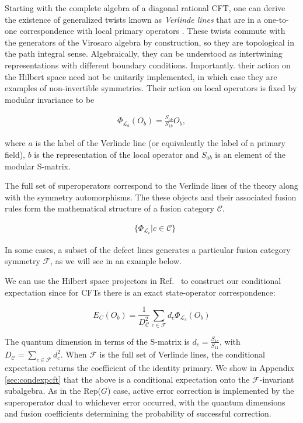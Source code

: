 \documentclass{article}
\newcommand{\mC}{\mathcal{C}}
\theoremstyle{definition}
\begin{document}
  Starting with the complete algebra of a diagonal rational CFT, one can derive the
  existence of generalized twists known as \textit{Verlinde lines} that are in a
  one-to-one correspondence with local primary operators
  \cite{petkova2001generalised}. These twists commute with the generators of the
  Virosaro algebra by construction, so they are topological in the path integral
  sense. Algebraically, they can be understood as intertwining representations
  with different boundary conditions. Importantly. their action on the Hilbert
  space need not be unitarily implemented, in which case they are examples of non-invertible
  symmetries. Their action on local operators is fixed by modular invariance to
  be

  \begin{eqnarray}
    \Phi_{\mathcal{L}_a}(O_b) = \frac{S_{ab}}{S_{1b}} O_b,
  \end{eqnarray}

  where $a$ is the label of the Verlinde line (or equivalently the label of a primary
  field), $b$ is the representation of the local operator and $S_{ab}$ is an element
  of the modular S-matrix.

  The full set of superoperators correspond to the Verlinde lines of the theory along
  with the symmetry automorphisms. The these objects and their associated fusion
  rules form the mathematical structure of a fusion category $\mC$.

  \begin{eqnarray}
    &\{\Phi_{\mathcal{L}_{c}}| c \in \mC\}
  \end{eqnarray}

  In some cases, a subset of the defect lines generates a particular fusion
  category symmetry $\mathcal{F}$, as we will see in an example below.

  We can use the Hilbert space projectors in Ref.~\cite{tachikawa2023asymptoticdos}
  to construct our conditional expectation since for CFTs there is an exact
  state-operator correspondence:

  \begin{equation}
    \label{eq:E-def-cft}E_{C}(O_{b})=\frac{1}{D_{\mathcal{C}}^{2}}\sum_{c\in \mathcal{F}}
    d_{c}\Phi_{\mathcal{L}_c}(O_{b})
  \end{equation}

  The quantum dimension in terms of the S-matrix is $d_{c}= \frac{S_{1c}}{S_{11}}$,
  with $D_{\mathcal{C}}= \sum_{c\in\mathcal{F}}d_{c}^{2}$. When $\mathcal{F}$ is
  the full set of Verlinde lines, the conditional expectation returns the
  coefficient of the identity primary. We show in Appendix \ref{sec:condexpcft} that
  the above is a conditional expectation onto the $\mathcal{F}$-invariant subalgebra.
  As in the Rep($G$) case, active error correction is implemented by the
  superoperator dual to whichever error occurred, with the quantum dimensions and
  fusion coefficients determining the probability of successful correction.
\end{document}
